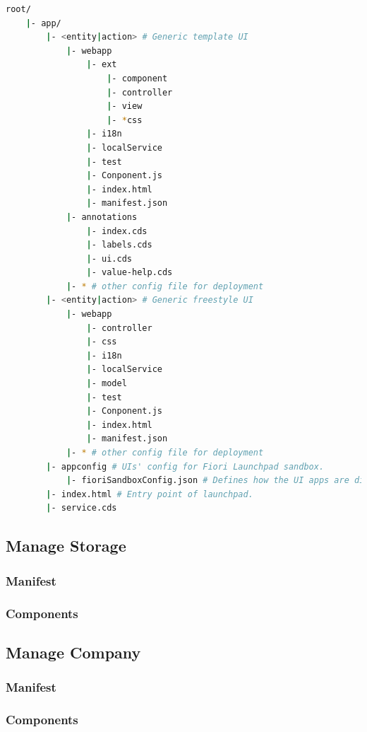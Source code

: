 \begin{lstlisting}[language={bash}]
root/
    |- app/
        |- <entity|action> # Generic template UI
            |- webapp
                |- ext
                    |- component 
                    |- controller
                    |- view
                    |- *css 
                |- i18n
                |- localService
                |- test
                |- Conponent.js
                |- index.html
                |- manifest.json
            |- annotations
                |- index.cds
                |- labels.cds
                |- ui.cds
                |- value-help.cds
            |- * # other config file for deployment
        |- <entity|action> # Generic freestyle UI
            |- webapp
                |- controller
                |- css
                |- i18n
                |- localService
                |- model
                |- test
                |- Conponent.js
                |- index.html
                |- manifest.json
            |- * # other config file for deployment
        |- appconfig # UIs' config for Fiori Launchpad sandbox.
            |- fioriSandboxConfig.json # Defines how the UI apps are dispalyed and navigated.
        |- index.html # Entry point of launchpad.
        |- service.cds
\end{lstlisting}

\subsection{Manage Storage}
\subsubsection{Manifest}
\subsubsection{Components}

\subsection{Manage Company}
\subsubsection{Manifest}
\subsubsection{Components}

